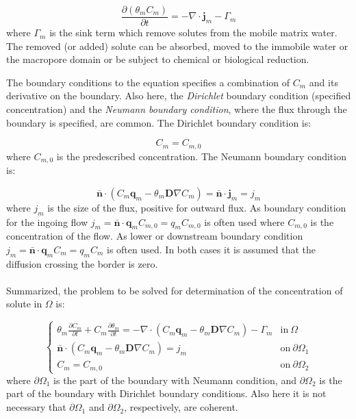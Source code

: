 \documentclass{report}
\begin{document}
\begin{equation}
\frac{\partial (\theta_{m} C_{m})} {\partial t}
   =-\nabla \cdot \mathbf{j}_{m} - \Gamma_{m}
\label{eq:solmassbal_im}
\end{equation}
%
where $\Gamma_{m}$ is the sink term which remove solutes from the
mobile matrix water. The removed (or added) solute can be absorbed,
moved to the immobile water or the macropore domain or be subject to
chemical or biological reduction.

The boundary conditions to the equation specifies a combination of
$C_{m}$ and its derivative on the boundary. Also here, the
\textit{Dirichlet} boundary condition (specified
concentration) and the \textit{Neumann boundary
  condition}, where the flux through the boundary is
specified, are common. The Dirichlet boundary condition is:

\begin{equation}
C_{m}=C_{m,0} \label{eq:Dirichlet_heat}
\end{equation}
%
where $C_{m,0}$ is the predescribed concentration. The Neumann
boundary condition is:

\begin{equation}
 \mathbf{\bar{n}}\cdot (C_{m}\mathbf{q}_{m}-\theta_{m}\mathbf{D}\nabla
 C_{m})=\mathbf{\bar{n}}\cdot \mathbf{j}_{m}=j_{m}
\label{eq:Neumann_heat}
\end{equation}
%
where $j_{m}$ is the size of the flux, positive for outward flux. As
boundary condition for the ingoing flow
$j_{m}=\mathbf{\bar{n}}\cdot\mathbf{q}_{m}C_{m,0}=q_{m}C_{m,0}$ is
often used where $C_{m,0}$ is the concentration of the flow. As
lower or downstream boundary condition
$j_{m}=\mathbf{\bar{n}}\cdot\mathbf{q}_{m}C_{m}=q_{m}C_{m}$ is often
used. In both cases it is assumed that the diffusion crossing the border is zero.\\
\\
Summarized, the problem to be solved for determination of the
concentration of solute in $\Omega$ is:

\begin{equation}
\begin{cases}
 \theta_{m} \frac{\partial C_{m}}{\partial t} + C_{m} \frac{\partial
  \theta_{m}}{\partial t} =  -\nabla \cdot(C_{m}
  \mathbf{q}_{m}-\theta_{m}
  \mathbf{D}\nabla C_{m})- \Gamma_{m} &
  \text{in} \ \Omega \\
 \mathbf{\bar{n}}\cdot (C_{m}\mathbf{q}_{m}-\theta_{m}\mathbf{D}\nabla C_{m})=j_{m} &
  \text{on}\  \partial\Omega_1 \\
 C_{m}=C_{m,0} & \text{on}\ \partial\Omega_2
\end{cases}
\label{eq:heatmovement}
\end{equation}
%
where $\partial \Omega_1$ is the part of the boundary with Neumann
condition, and $\partial \Omega_2$ is the part of the boundary with
Dirichlet boundary conditions. Also here it is not necessary that
$\partial \Omega_1$ and $\partial \Omega_2$, respectively, are
coherent.
\end{document}
